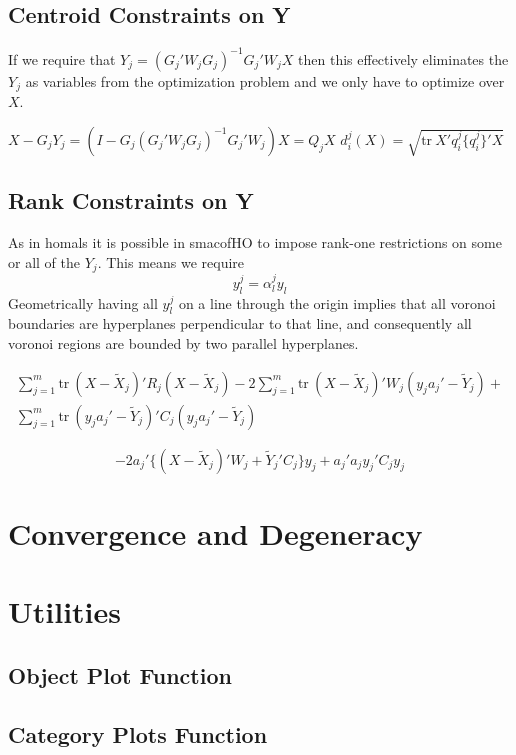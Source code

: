 \documentclass[
  12pt,
]{article}
\begin{document}
\subsection{Centroid Constraints on Y}\label{centroid-constraints-on-y}

If we require that \(Y_j=(G_j'W_jG_j)^{-1}G_j'W_jX\) then this effectively eliminates the \(Y_j\) as variables from the optimization problem and we only have to optimize over \(X\).

\(X-G_jY_j=(I-G_j(G_j'W_jG_j)^{-1}G_j'W_j)X=Q_jX\)
\(d_i^j(X)=\sqrt{\text{tr}\ X'q^j_i\{q^j_i\}'X}\)

\subsection{Rank Constraints on Y}\label{rank-constraints-on-y}

As in homals it is possible in smacofHO to impose rank-one restrictions on some or all of the \(Y_j\). This means we require
\[
y_l^j=\alpha_{l}^jy_l^{\ }{}
\]
Geometrically having all \(y_l^j\) on a line through the origin implies that
all voronoi boundaries are hyperplanes perpendicular to that line, and consequently all voronoi regions are bounded by two parallel hyperplanes.

\begin{multline}
\sum_{j=1}^m\text{tr}\ (X-\tilde X_j)'R_j(X-\tilde X_j)-2\sum_{j=1}^m\text{tr}\ (X-\tilde X_j)'W_j(y_ja_j'-\tilde Y_j)+\\
\sum_{j=1}^m\text{tr}\ (y_ja_j'-\tilde Y_j)'C_j(y_ja_j'-\tilde Y_j)
\end{multline}

\[
-2a_j'\{(X-\tilde X_j)'W_j+\tilde Y_j'C_j\}y_j+a_j'a_jy_j'C_jy_j
\]

\section{Convergence and Degeneracy}\label{convergence-and-degeneracy}

\section{Utilities}\label{utilities}

\subsection{Object Plot Function}\label{object-plot-function}

\subsection{Category Plots Function}\label{category-plots-function}
\end{document}
